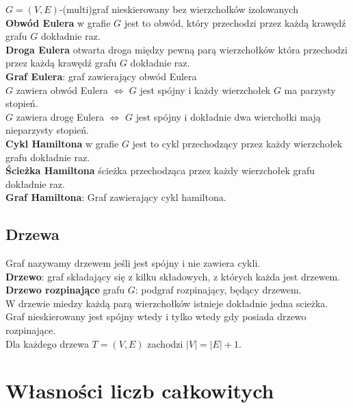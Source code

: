 \documentclass[a4paper,12pt]{article}
\begin{document}
$G=(V,E)$-(multi)graf nieskierowany bez wierzchołków izolowanych\\
\textbf{Obwód Eulera} w grafie $G$ jest to obwód, który przechodzi przez każdą krawędź grafu $G$ dokładnie raz.\\
\textbf{Droga Eulera} otwarta droga między pewną parą wierzchołków która przechodzi przez każdą krawędź grafu $G$ dokładnie raz.\\
\textbf{Graf Eulera}: graf zawierający obwód Eulera\\
$G$ zawiera obwód Eulera $\Leftrightarrow$ $G$ jest spójny i każdy wierzchołek $G$ ma parzysty stopień. \\
$G$ zawiera drogę Eulera $\Leftrightarrow$ $G$ jest spójny i dokładnie dwa wierchołki mają nieparzysty stopień. \\
\textbf{Cykl Hamiltona} w grafie $G$ jest to cykl przechodzący przez każdy wierzchołek grafu dokładnie raz.\\
\textbf{Ścieżka Hamiltona} ścieżka przechodząca przez każdy wierzchołek grafu dokładnie raz.\\
\textbf{Graf Hamiltona}: Graf zawierający cykl hamiltona.\\
\subsection{Drzewa}
Graf nazywamy drzewem jeśli jest spójny i nie zawiera cykli.\\
\textbf{Drzewo}: graf składający się z kilku składowych, z których każda jest drzewem.\\
\textbf{Drzewo rozpinające} grafu $G$: podgraf rozpinający, będący drzewem.\\
W drzewie miedzy każdą parą wierzchołków istnieje dokładnie jedna scieżka.\\
Graf nieskierowany jest spójny wtedy i tylko wtedy gdy posiada drzewo rozpinające.\\
Dla każdego drzewa $T=(V,E)$ zachodzi $|V|=|E|+1$.\\
\section{Własności liczb całkowitych}\\
\end{document}
